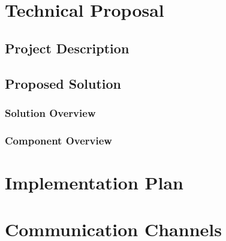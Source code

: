 \documentclass[a4paper]{article}
\begin{document}
	\section{Technical Proposal}
	
		\subsection{Project Description}
		
		\subsection{Proposed Solution}
		
			\subsubsection{Solution Overview}
			
			\subsubsection{Component Overview}
			
	\section{Implementation Plan}
	
	\section{Communication Channels}
\end{document}

